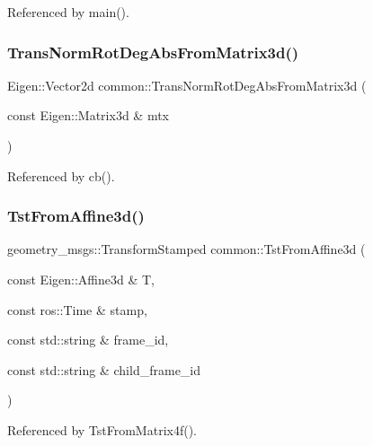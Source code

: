 Referenced by main().

\mbox{\label{namespacecommon_a191afad1f06d091167c390fbe1457b5d}} 
\subsubsection{\texorpdfstring{Trans\+Norm\+Rot\+Deg\+Abs\+From\+Matrix3d()}{TransNormRotDegAbsFromMatrix3d()}}
{\footnotesize\ttfamily Eigen\+::\+Vector2d common\+::\+Trans\+Norm\+Rot\+Deg\+Abs\+From\+Matrix3d (\begin{DoxyParamCaption}\item[{const Eigen\+::\+Matrix3d \&}]{mtx }\end{DoxyParamCaption})}



Referenced by cb().

\mbox{\label{namespacecommon_af406e07c4c8640ce9b10a2ff45365ae1}} 
\subsubsection{\texorpdfstring{Tst\+From\+Affine3d()}{TstFromAffine3d()}}
{\footnotesize\ttfamily geometry\+\_\+msgs\+::\+Transform\+Stamped common\+::\+Tst\+From\+Affine3d (\begin{DoxyParamCaption}\item[{const Eigen\+::\+Affine3d \&}]{T,  }\item[{const ros\+::\+Time \&}]{stamp,  }\item[{const std\+::string \&}]{frame\+\_\+id,  }\item[{const std\+::string \&}]{child\+\_\+frame\+\_\+id }\end{DoxyParamCaption})}



Referenced by Tst\+From\+Matrix4f().

\mbox{\label{namespacecommon_a3e57252779375868d389d7c9f943a44f}} 
